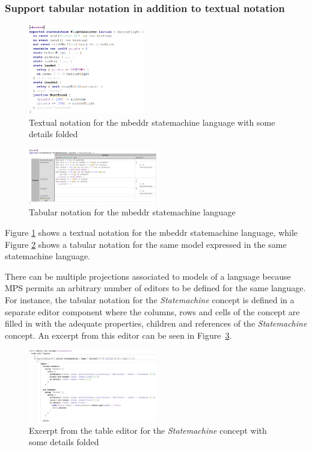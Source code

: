 \documentclass[preprint,numbers,10pt]{sigplanconf}
\begin{document}
\subsubsection{Support tabular notation in addition to textual notation}\label{sec:tabnot}
\begin{figure}[H]
	\centering
	\includegraphics[width=0.45\textwidth]{screens/TextualNotationStatemachine.png}
	\caption{Textual notation for the mbeddr statemachine language with some details folded}
	\label{fig:txtnotationsm}
\end{figure}
\begin{figure}[H]
	\centering
	\includegraphics[width=0.50\textwidth]{screens/TabularNotationStatemachines.png}
	\caption{Tabular notation for the mbeddr statemachine language}
	\label{fig:tabnotationsm}
\end{figure}
Figure \ref{fig:txtnotationsm} shows a textual notation for the mbeddr statemachine language,
while Figure \ref{fig:tabnotationsm} shows a tabular notation for the same model expressed in the same statemachine language.

There can be multiple projections associated to models of a language because MPS permits an arbitrary
number of editors to be defined for the same language.
For instance, the tabular notation for the \emph{Statemachine} concept is defined
in a separate editor component where the columns, rows and cells of the concept are filled in
with the adequate properties, children and references of the \emph{Statemachine} concept.
An excerpt from this editor can be seen in Figure~\ref{fig:TableEditorStatemachine}.

\begin{figure}[H]
	\centering
	\includegraphics[width=0.50\textwidth]{screens/TableEditorStatemachine.png}
	\caption{Excerpt from the table editor for the \emph{Statemachine} concept with some details folded}
	\label{fig:TableEditorStatemachine}
\end{figure}
\end{document}
